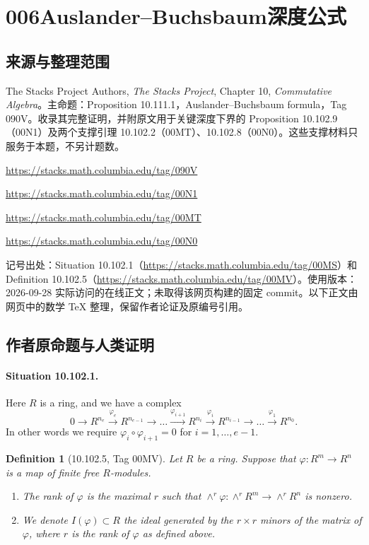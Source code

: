 \documentclass[UTF8,11pt]{ctexart}
\newtheorem*{definition}{Definition}
\begin{document}
\section*{006\quad Auslander--Buchsbaum深度公式}
\subsection*{来源与整理范围}
The Stacks Project Authors, \emph{The Stacks Project}, Chapter 10, \emph{Commutative Algebra}。主命题：Proposition 10.111.1，Auslander--Buchsbaum formula，Tag 090V。收录其完整证明，并附原文用于关键深度下界的 Proposition 10.102.9（00N1）及两个支撑引理 10.102.2（00MT）、10.102.8（00N0）。这些支撑材料只服务于本题，不另计题数。
\par\url{https://stacks.math.columbia.edu/tag/090V}
\par\url{https://stacks.math.columbia.edu/tag/00N1}
\par\url{https://stacks.math.columbia.edu/tag/00MT}
\par\url{https://stacks.math.columbia.edu/tag/00N0}
\par 记号出处：Situation 10.102.1（\url{https://stacks.math.columbia.edu/tag/00MS}）和 Definition 10.102.5（\url{https://stacks.math.columbia.edu/tag/00MV}）。使用版本：2026-09-28 实际访问的在线正文；未取得该网页构建的固定 commit。以下正文由网页中的数学 TeX 整理，保留作者论证及原编号引用。

\subsection*{作者原命题与人类证明}
\paragraph{Situation 10.102.1.}
Here $R$ is a ring, and we have a complex
\[
0\to R^{n_e}\xrightarrow{\varphi_e}R^{n_{e-1}}\to\ldots
\xrightarrow{\varphi_{i+1}}R^{n_i}\xrightarrow{\varphi_i}R^{n_{i-1}}
\to\ldots\xrightarrow{\varphi_1}R^{n_0}.
\]
In other words we require $\varphi_i\circ\varphi_{i+1}=0$ for $i=1,\ldots,e-1$.

\begin{definition}[10.102.5, Tag 00MV]
Let $R$ be a ring. Suppose that $\varphi:R^m\to R^n$ is a map of finite free $R$-modules.
\begin{enumerate}
\item The rank of $\varphi$ is the maximal $r$ such that $\wedge^r\varphi:\wedge^rR^m\to\wedge^rR^n$ is nonzero.
\item We denote $I(\varphi)\subset R$ the ideal generated by the $r\times r$ minors of the matrix of $\varphi$, where $r$ is the rank of $\varphi$ as defined above.
\end{enumerate}
\end{definition}
\end{document}
